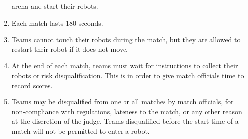 \begin{enumerate}
        arena and start their robots.
  \item Each match lasts $180$ seconds.
  \item Teams cannot touch their robots during the match, but they are allowed
        to restart their robot if it does not move.
  \item At the end of each match, teams must wait for instructions to collect
        their robots or risk disqualification. This is in order to give match
        officials time to record scores.
  \item Teams may be disqualified from one or all matches by match officials,
        for non-compliance with regulations, lateness to the match, or any other
        reason at the discretion of the judge. Teams disqualified before the
        start time of a match will not be permitted to enter a robot.
\end{enumerate}
